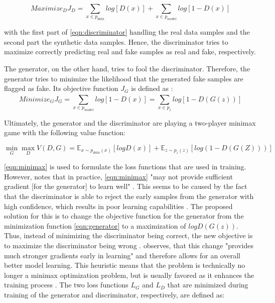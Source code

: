 \begin{equation}
    \label{eqn:discriminator}
    Maximize_DJ_D= \sum_{x\in p_{data}}^{} log [D(x)] + \sum_{x\in p_{model}}^{} log [1-D(x)]
\end{equation}

with the first part of \autoref{eqn:discriminator} handling the real data samples and the second part the synthetic data samples.
Hence, the discriminator tries to maximize correctly predicting real and fake samples as real and fake, respectively.

The generator, on the other hand, tries to fool the discriminator.
Therefore, the generator tries to minimize the likelihood that the generated fake samples are flagged as fake.
Its objective function $J_G$ is defined as \cite{aggarwal2018NeuralNetworksDeep}:
\begin{equation}
    \label{eqn:generator}
    Minimize_GJ_G= \sum_{x\in p_{model}}^{} log [1-D(x)] = \sum_{x\in p_z}^{} log [1-D(G(z))]
\end{equation}

\newpage %
Ultimately, the generator and the discriminator are playing a two-player minimax game with the following value function:

\begin{equation}
    \label{eqn:minimax}
    \min_G\max_DV(D,G)=\mathbb{E}_{x\sim p_{data}(x)} [log D(x)] + \mathbb{E}_{z\sim p_z(z)}[log( 1-D(G(Z)))]
\end{equation}

\autoref{eqn:minimax} is used to formulate the loss functions that are used in training.
However, \cite{NIPS2014_5ca3e9b1} notes that in practice, \autoref{eqn:minimax} "may not provide sufficient gradient [for the generator] to learn well" \cite[p. 3]{NIPS2014_5ca3e9b1}.
This seems to be caused by the fact that the discriminator is able to reject the early samples from the generator with high confidence, which results in poor learning capabilities \cite{NIPS2014_5ca3e9b1}.
The proposed solution for this is to change the objective function for the generator from the minimization function \autoref{eqn:generator} to a maximization of $logD(G(z))$.
Thus, instead of minimizing the discriminator being correct, the new objective is to maximize the discriminator being wrong \cite{NIPS2014_5ca3e9b1}. 
\textcite[p. 3]{NIPS2014_5ca3e9b1} observes, that this change "provides much stronger gradients early in learning" and therefore allows for an overall better model learning.
This heuristic means that the problem is technically no longer a minimax optimization problem, but is usually favored as it enhances the training process \cite[p. 442]{aggarwal2018NeuralNetworksDeep}.
The two loss functions $L_G$ and $L_D$ that are minimized during training of the generator and discriminator, respectively, are defined as:

